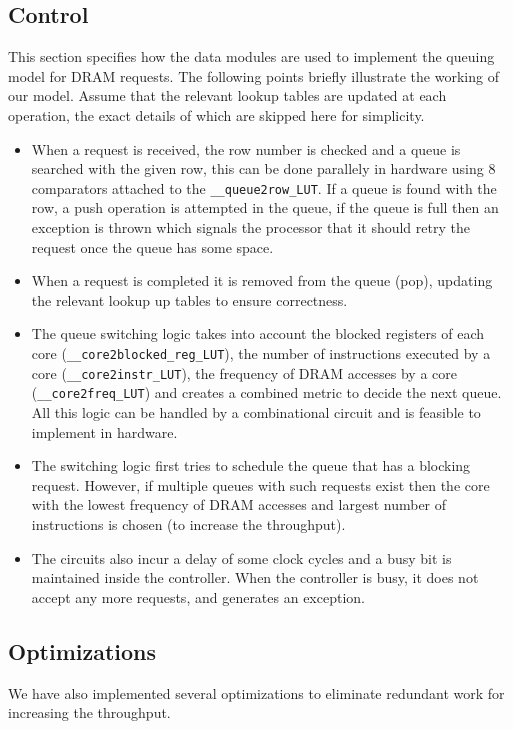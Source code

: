 \documentclass[hidelinks,12pt]{article}
\begin{document}
\subsection{Control}
This section specifies how the data modules are used to implement the queuing model for DRAM requests.
The following points briefly illustrate the working of our model. Assume that the relevant lookup tables are updated
at each operation, the exact details of which are skipped here for simplicity.
\begin{itemize}
    \item When a request is received, the row number is checked and a queue is searched with the given row, this can be done parallely in hardware using
          8 comparators attached to the \verb|__queue2row_LUT|. If a queue is found with the row, a push operation is attempted in the queue, if the queue is full then
          an exception is thrown which signals the processor that it should retry the request once the queue has some space.
    \item When a request is completed it is removed from the queue (pop), updating the relevant lookup up tables to ensure correctness.
    \item The queue switching logic takes into account the blocked registers of each core (\verb|__core2blocked_reg_LUT|), the number of instructions executed by a core (\verb|__core2instr_LUT|), the frequency of DRAM accesses by a core (\verb|__core2freq_LUT|)
          and creates a combined metric to decide the next queue. All this logic can be handled by a combinational circuit and is feasible to implement in hardware.
    \item The switching logic first tries to schedule the queue that has a blocking request. However, if multiple queues with such requests exist then the core with the lowest frequency of DRAM accesses and largest number of instructions is chosen (to increase the throughput).
    \item The circuits also incur a delay of some clock cycles and a busy bit is maintained inside the controller. When the controller is busy, it does not accept any more requests, and generates an exception.
\end{itemize}
\newpage
\subsection{Optimizations}

We have also implemented several optimizations to eliminate redundant work for increasing the throughput.
\end{document}
